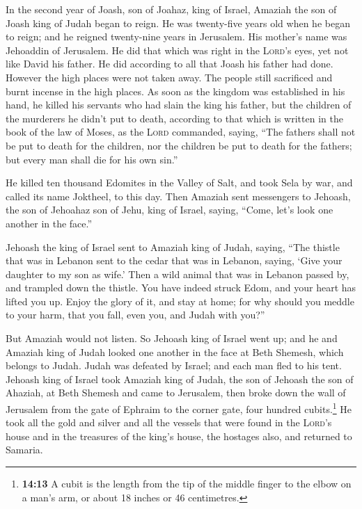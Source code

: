  In the second year of Joash, son of Joahaz, king of
Israel, Amaziah the son of Joash king of Judah began to reign.
 He was twenty-five years old when he began to reign; and
he reigned twenty-nine years in Jerusalem. His mother's name was
Jehoaddin of Jerusalem.  He did that which was right in
the \textsc{Lord}'s eyes, yet not like David his father. He did
according to all that Joash his father had done.  However
the high places were not taken away. The people still sacrificed and
burnt incense in the high places.  As soon as the kingdom
was established in his hand, he killed his servants who had slain the
king his father,  but the children of the murderers he
didn't put to death, according to that which is written in the book of
the law of Moses, as the \textsc{Lord} commanded, saying, ``The fathers
shall not be put to death for the children, nor the children be put to
death for the fathers; but every man shall die for his own sin.''

 He killed ten thousand Edomites in the Valley of Salt,
and took Sela by war, and called its name Joktheel, to this day.
 Then Amaziah sent messengers to Jehoash, the son of
Jehoahaz son of Jehu, king of Israel, saying, ``Come, let's look one
another in the face.''

 Jehoash the king of Israel sent to Amaziah king of Judah,
saying, ``The thistle that was in Lebanon sent to the cedar that was in
Lebanon, saying, `Give your daughter to my son as wife.' Then a wild
animal that was in Lebanon passed by, and trampled down the thistle.
 You have indeed struck Edom, and your heart has lifted
you up. Enjoy the glory of it, and stay at home; for why should you
meddle to your harm, that you fall, even you, and Judah with you?''

 But Amaziah would not listen. So Jehoash king of Israel
went up; and he and Amaziah king of Judah looked one another in the face
at Beth Shemesh, which belongs to Judah.  Judah was
defeated by Israel; and each man fled to his tent. 
Jehoash king of Israel took Amaziah king of Judah, the son of Jehoash
the son of Ahaziah, at Beth Shemesh and came to Jerusalem, then broke
down the wall of Jerusalem from the gate of Ephraim to the corner gate,
four hundred cubits.\footnote{\textbf{14:13} A cubit is the length from
  the tip of the middle finger to the elbow on a man's arm, or about 18
  inches or 46 centimetres.}  He took all the gold and
silver and all the vessels that were found in the \textsc{Lord}'s house
and in the treasures of the king's house, the hostages also, and
returned to Samaria.

